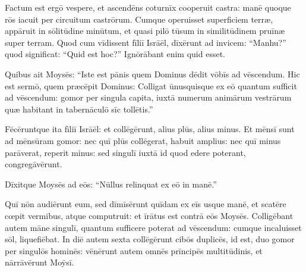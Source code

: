 Factum est ergō vespere, et ascendēns coturnīx
cooperuit castra: manē 
quoque rōs iacuit per circuitum castrōrum. Cumque operuisset superficiem
terræ, appāruit in
sōlitūdine minūtum, et quasi  pilō tūsum in
similitūdinem pruīnæ super terram. Quod
cum vīdissent fīliī Isrāēl, dīxērunt ad invicem: ``Manhu?'' quod significat: ``Quid est
hoc?'' Ignōrābant enim quid esset. 

Quibus ait Moysēs: ``Iste est pānis quem
Dominus dēdit vōbīs ad vēscendum. Hic est sermō, quem
præcēpit Dominus: Colligat ūnusquisque ex eō
quantum sufficit ad vēscendum: gomor per singula capita,
iuxtā numerum animārum vestrārum quæ habitant in
tabernāculō sīc tollētis.''

Fēcēruntque ita fīliī Isrāēl:
et collēgērunt, alius plūs, alius minus. Et mēnsī sunt
ad 
mēnsūram gomor: nec quī plūs collēgerat, habuit
amplius: nec quī minus parāverat, reperit minus: sed
singulī iuxtā id quod edere poterant, congregāvērunt. 

Dīxitque Moysēs ad eōs: ``Nūllus relinquat ex eō in manē.''

Quī nōn audiērunt eum, sed
dīmīsērunt quīdam ex eīs usque manē, et scatēre cœpit
vermibus, atque computruit: et īrātus est
contrā eōs Moysēs. Colligēbant autem māne singulī,
quantum sufficere poterat ad vēscendum: cumque incaluisset
sōl, liquefiēbat. In diē autem sexta collēgērunt cibōs
duplicēs, id est, duo gomor per singulōs hominēs: vēnērunt
autem omnēs prīncipēs multitūdinis, et nārrāvērunt Moȳsī. 

